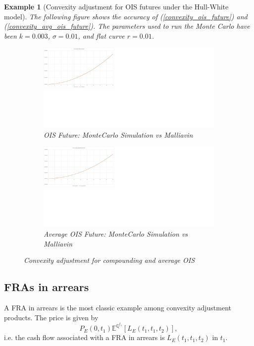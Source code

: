 \documentclass[a4paper,10pt]{article}
\newtheorem{example}[theorem]{Example}
\newcommand{\1}{\mathbf{1}}
\begin{document}
\begin{example}[Convexity adjustment for OIS futures under the Hull-White model]
The following figure shows the accuracy of (\ref{convexity_ois_future}) and (\ref{convexity_avg_ois_future}). The parameters used to run the Monte Carlo have been $k=0.003$, $\sigma=0.01$, and flat curve $r=0.01$. 
\begin{figure}[H]
\begin{subfigure}{.5\textwidth}
  \centering
  \includegraphics[scale=0.2]{Figures/convexity_ois.jpg}
		\caption{OIS Future: MonteCarlo Simulation vs Malliavin}
\end{subfigure}
\begin{subfigure}{.5\textwidth}
  \centering
  \includegraphics[scale=0.2]{Figures/convexity_avg_ois.jpg}
		\caption{Average OIS Future: MonteCarlo Simulation vs Malliavin}
\end{subfigure}
\caption{Convexity adjustment for compounding and average OIS}
\end{figure} 
\end{example}



\subsection{FRAs in arrears}
A FRA in arrears is the most classic example among convexity adjustment products. The price is given by
\begin{equation}\label{FRAinArrear}
P_{E}(0,t_1)\mathbb{E}^{\mathbb{Q}^{t_1}}\left[L_{E}(t_1,t_1,t_2)\right],
\end{equation}
i.e. the cash flow associated with a FRA in arrears is $L_{E}(t_1,t_1,t_2)$ in $t_1$.
\end{document}
